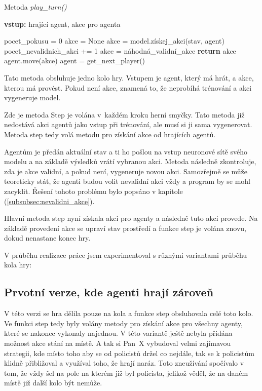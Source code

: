 \begin{algorithm}[H]
  \caption{Metoda \emph{play\_turn()}}
  \label{alg:play_turn}
  \begin{algorithmic}
    \State \textbf{vstup:} hrající agent, akce pro agenta
    \State

      \State pocet\_pokusu = 0
      \State akce = None
          \State akce = model.získej\_akci(stav, agent)
          \State pocet\_nevalidnich\_akci += 1
        \Else
        \State akce = náhodná\_validní\_akce
        \EndIf
      \EndWhile
      \State \textbf{return} akce
    \EndIf
    \State agent.move(akce)
    \State agent = get\_next\_player()
  \end{algorithmic}
\end{algorithm}

Tato metoda obsluhuje jedno kolo hry.
Vstupem je agent, který má hrát, a akce, kterou má provést.
Pokud není akce, znamená to, že neprobíhá trénování a akci vygeneruje model.

Zde je metoda Step je volána v~každém kroku  herní smyčky.
Tato metoda již nedostává akci agentů jako vstup při trénování, ale musí si ji sama vygenerovat.
Metoda step tedy volá metodu pro získání akce od hrajících agentů.

Agentům je předán aktuální stav a ti ho pošlou na vstup neuronové sítě svého modelu a na základě výsledků vrátí vybranou akci.
Metoda následně zkontroluje, zda je akce validní, a pokud není, vygeneruje novou akci.
Samozřejmě se může teoreticky stát, že agenti budou volit nevalidní akci vždy a program by se mohl zacyklit.
Řešení tohoto problému bylo popsáno v kapitole  (\ref{subsubsec:nevalidni_akce}).

Hlavní metoda step nyní získala akci pro agenty a následně tuto akci provede.
Na základě provedení akce se upraví stav prostředí a funkce step je volána znovu, dokud nenastane konec hry.


V průběhu realizace práce jsem experimentoval s různými variantami průběhu kola hry:
\subsection{Prvotní verze, kde agenti hrají zároveň}
V této verzi se hra dělila pouze na kola a funkce step obsluhovala celé toto kolo.
Ve funkci step tedy byly volány metody pro získání akce pro všechny agenty, které se nakonec vykonaly najednou.
V této variantě ještě nebyla přidána možnost akce stání na místě.
A tak si Pan~X vybudoval velmi zajímavou strategii, kde místo toho aby se od policistů držel co nejdále, tak se k policistům klidně přibližoval a využíval toho, že hrají naráz.
Toto zneužívání spočívalo v tom, že vždy šel na pole na kterém již byl policista, jelikož věděl, že na daném místě již další kolo být nemůže.


